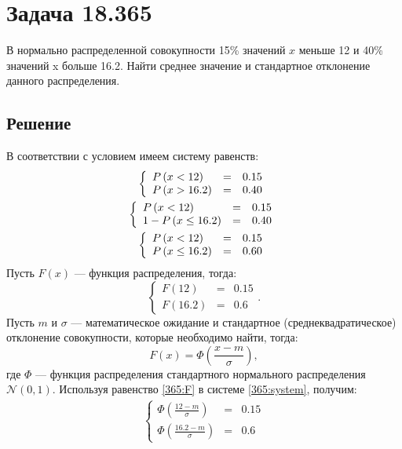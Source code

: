 \section*{Задача 18.365}

В нормально распределенной совокупности 15\% значений $x$ меньше 12 и 40\% значений x больше 16.2. Найти среднее значение и стандартное отклонение данного распределения.
\subsection*{Решение}
В соответствии с условием имеем систему равенств:
\begin{gather}
    \left \{
    \begin{array}{lcl}
        P \left ( x < 12 \right )   & = & 0.15 \\
        P \left ( x > 16.2 \right ) & = & 0.40
    \end{array}
    \right . \\
    \left \{
    \begin{array}{lcl}
        P \left ( x < 12 \right )         & = & 0.15 \\
        1 - P \left ( x \le 16.2 \right ) & = & 0.40
    \end{array}
    \right . \\
    \left \{
    \begin{array}{lcl}
        P \left ( x < 12 \right )     & = & 0.15 \\
        P \left ( x \le 16.2 \right ) & = & 0.60
    \end{array}
    \right .
\end{gather}
Пусть $F(x)$ --- функция распределения, тогда:
\begin{equation}
    \label{365:system}
    \left \{
    \begin{array}{lcl}
        F(12)   & = & 0.15 \\
        F(16.2) & = & 0.6
    \end{array}
    \right .
    .
\end{equation}
Пусть $m$ и $\sigma$ --- математическое ожидание и стандартное (среднеквадратическое) отклонение совокупности, которые необходимо найти, тогда:
\begin{equation}
    \label{365:F}
    F(x) = \Phi \left ( \frac{x - m}{\sigma} \right ),
\end{equation}
где $\Phi$ --- функция распределения стандартного нормального распределения $\mathcal{N}(0, 1)$. Используя равенство \eqref{365:F} в системе \eqref{365:system}, получим:
\begin{gather}
    \left \{
    \begin{array}{lcl}
        \Phi \left ( \frac{12-m}{\sigma} \right )   & = & 0.15 \\
        \Phi \left ( \frac{16.2-m}{\sigma} \right ) & = & 0.6
    \end{array}
    \right .
\end{gather}
